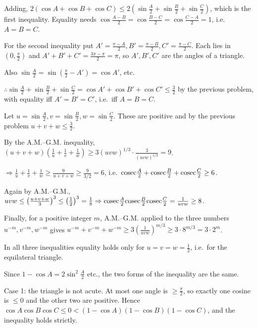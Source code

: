   Adding, $2(\cos A + \cos B + \cos C)\leq 2\left(\sin\frac{A}{2} + \sin\frac{B}{2}
  + \sin\frac{C}{2}\right)$, which is the first inequality. Equality needs $\cos\frac{A - B}{2} = \cos\frac{B
    - C}{2} = \cos\frac{C - A}{2} = 1$, i.e.\ $A = B = C$.

  For the second inequality put $A' = \frac{\pi - A}{2}, B' = \frac{\pi - B}{2}, C' = \frac{\pi -
    C}{2}$. Each lies in $\left(0, \frac{\pi}{2}\right)$ and $A' + B' + C' = \frac{3\pi - \pi}{2} = \pi$, so
  $A', B', C'$ are the angles of a triangle.

  Also $\sin\frac{A}{2} = \sin\left(\frac{\pi}{2} - A'\right) = \cos A'$, etc.

  $\therefore\sin\frac{A}{2} + \sin\frac{B}{2} + \sin\frac{C}{2} = \cos A' + \cos B' + \cos C'\leq\frac{3}{2}$
  by the previous problem, with equality iff $A' = B' = C'$, i.e.\ iff $A = B = C$.
\item Let $u = \sin\frac{A}{2}, v = \sin\frac{B}{2}, w = \sin\frac{C}{2}$. These are positive and by the
  previous problem $u + v + w\leq\frac{3}{2}$.

  By the A.M.--G.M. inequality, $(u + v + w)\left(\frac{1}{u} + \frac{1}{v} + \frac{1}{w}\right)\geq
  3(uvw)^{1/3}\cdot\frac{3}{(uvw)^{1/3}} = 9$.

  $\Rightarrow\frac{1}{u} + \frac{1}{v} + \frac{1}{w}\geq\frac{9}{u + v + w}\geq\frac{9}{3/2} = 6$, i.e.\
  ${\rm cosec}\frac{A}{2} + {\rm cosec}\frac{B}{2} + {\rm cosec}\frac{C}{2}\geq 6$.

  Again by A.M.--G.M., $uvw\leq\left(\frac{u + v + w}{3}\right)^3\leq\left(\frac{1}{2}\right)^3
  = \frac{1}{8}\Rightarrow{\rm cosec}\frac{A}{2}{\rm cosec}\frac{B}{2}{\rm cosec}\frac{C}{2}
  = \frac{1}{uvw}\geq 8$.

  Finally, for a positive integer $m$, A.M.--G.M. applied to the three numbers $u^{-m}, v^{-m}, w^{-m}$
  gives $u^{-m} + v^{-m} + w^{-m}\geq 3\left(\frac{1}{uvw}\right)^{m/3}\geq 3\cdot 8^{m/3} = 3\cdot 2^m$.

  In all three inequalities equality holds only for $u = v = w = \frac{1}{2}$, i.e.\ for the equilateral
  triangle.
\item Since $1 - \cos A = 2\sin^2\frac{A}{2}$ etc., the two forms of the inequality are the same.

  Case 1: the triangle is not acute. At most one angle is $\geq\frac{\pi}{2}$, so exactly one cosine is
  $\leq 0$ and the other two are positive. Hence $\cos A\cos B\cos C\leq 0 < (1 - \cos A)(1 - \cos B)(1 - \cos
  C)$, and the inequality holds strictly.

